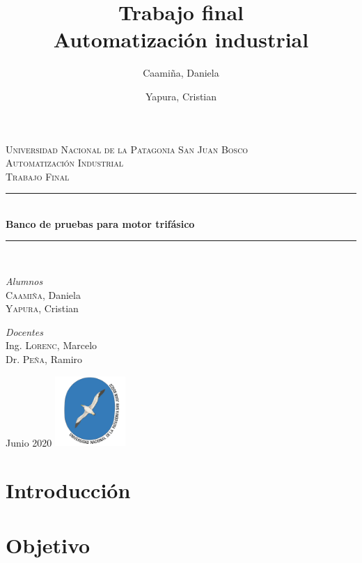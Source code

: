 \documentclass[12pt,a4paper]{article}
\date{}
\author{Caamiña, Daniela \and Yapura, Cristian}
\title{Trabajo final \\Automatización industrial}
\begin{document}
	\begin{titlepage} %
		\newcommand{\HRule}{\rule{\linewidth}{0.5mm}} 
		\center %
		\textsc{\LARGE Universidad Nacional de la Patagonia San Juan Bosco}\\[1.5cm]
		\textsc{\Large Automatización Industrial}\\[0.5cm]
		\textsc{\large Trabajo Final}\\[0.5cm] 
		\HRule\\[0.4cm]
		\huge\bfseries{Banco de pruebas para motor trifásico}\\[0.2cm] 
		\HRule\\[1.5cm]
			\begin{minipage}{0.4\textwidth}
				\begin{flushleft}
					\large
					\textit{Alumnos}\\
					\textsc{Caamiña,} Daniela \\
					\textsc{Yapura,} Cristian  
				\end{flushleft}
			\end{minipage}
			\begin{minipage}{0.4\textwidth}
				\begin{flushright}
					\large
					\textit{Docentes}\\
					Ing. \textsc{Lorenc,} Marcelo \\
					Dr. \textsc{Peña,} Ramiro  
				\end{flushright}
			\end{minipage}
		\vfill\vfill\vfill 
		\large{Junio 2020} 
		\vfill\vfill
		\includegraphics[width=0.2\textwidth]{unpsjb.png}\\[1cm] 
		\vfill 
	\end{titlepage}
	
\tableofcontents
\newpage

\listoffigures
\newpage	
		
\section{Introducción}


\section{Objetivo}

	
\end{document}
